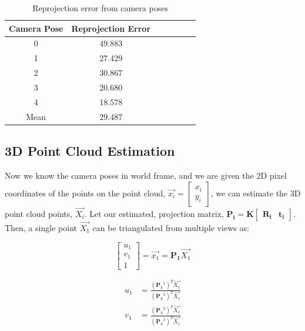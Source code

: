 \documentclass{article}
\begin{document}
\begin{table}[h]
    \centering
    \begin{tabular}{|c|c|c|c|c|c|c|}
        \hline
        Camera Pose & Reprojection Error \\
        \hline
        0 & 49.883 \\
        1 & 27.429 \\
        2 & 30.867 \\
        3 & 20.680 \\
        4 & 18.578 \\
        Mean & 29.487 \\
        \hline
    \end{tabular}
    \caption{Reprojection error from camera poses}
    \label{tab:reprojection_error_r_t}
\end{table}



\subsection{3D Point Cloud Estimation}
Now we know the camera poses in world frame, and we are given the 2D pixel coordinates of the points on the point cloud, $\vec{x_i} = \begin{bmatrix}
x_i \\ y_i
\end{bmatrix}$, we can estimate the 3D point cloud points, $\vec{X_i}$. Let our estimated, projection matrix, $\mathbf{P_i} = \mathbf{K} \begin{bmatrix} \mathbf{R_i} & \mathbf{t_i} \end{bmatrix}$. 
Then, a single point $\vec{X_1}$ can be triangulated from multiple views as:

\begin{equation}
    \begin{bmatrix} u_1 \\ v_1 \\ 1 \end{bmatrix} = \vec{x_1} = \mathbf{P_1} \vec{X_1}
\end{equation}

\begin{align}
    u_1 &= \frac{(\mathbf{P_1}^1)^T \vec{X_1}}{(\mathbf{P_1}^3)^T \vec{X_1}} \\
    v_1 &= \frac{(\mathbf{P_1}^2)^T \vec{X_1}}{(\mathbf{P_1}^3)^T \vec{X_1}}
\end{align}
\end{document}
